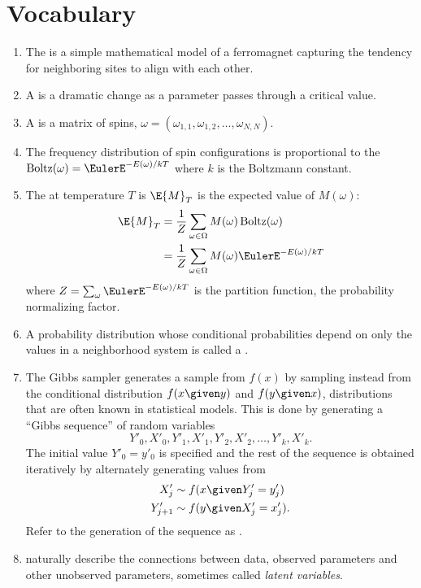 \documentclass[12pt]{article}
\begin{document}
\section*{Vocabulary}
\begin{enumerate}
    \item
        The  is a simple mathematical model of a
        ferromagnet capturing the tendency for neighboring sites to
        align with each other.
    \item
        A  is a dramatic change as a parameter
        passes through a critical value.
    \item
        A  is a matrix of spins, \( \omega = (\omega_
        {1,1}, \omega_{1,2}, \dots, \omega_{N,N}) \).
    \item
        The frequency distribution of spin configurations is
        proportional to the  \(
        \operatorname{Boltz}
        (\omega) = \EulerE^{-E(\omega)/kT} \) where \( k \) is the
        Boltzmann constant.
    \item
        The  at temperature \( T \) is \( \E{M}_T \)
        is the expected value of \( M(\omega) \):
        \begin{align*}
            \E{M}_T &= \frac{1}{Z} \sum\limits_{\omega \in \Omega} M(\omega)
            \operatorname{Boltz}
            (\omega) \\
            &= \frac{1}{Z} \sum\limits_{\omega \in \Omega} M(\omega)
            \EulerE^{-E(\omega)/kT}
        \end{align*}
        where \( Z = \sum_{\omega} \EulerE^{-E(\omega)/kT} \) is the
        partition function, the probability normalizing factor.
    \item
        A probability distribution whose conditional probabilities
        depend on only the values in a neighborhood system is called a
        .
    \item
        The Gibbs sampler generates a sample from \( f(x) \) by sampling
        instead from the conditional distribution \( f(x \given y) \)
        and \( f(y \given x) \), distributions that are often known in
        statistical models.  This is done by generating a ``Gibbs
        sequence'' of random variables
        \[
            Y'_0, X'_0, Y'_1, X'_1, Y'_2, X'_2, \dots, Y'_k, X'_k.
        \] The initial value \( Y'_0 = y'_0 \) is specified and the rest
        of the sequence is obtained iteratively by alternately
        generating values from
        \begin{align*}
            X'_j &\sim f(x \given Y'_j = y'_j) \\
            Y'_{j+1} &\sim f(y \given X'_j = x'_j).  \\
        \end{align*}
        Refer to the generation of the sequence as .
    \item
         naturally describe the
        connections between data, observed parameters and other
        unobserved parameters, sometimes called \emph{latent variables}.
\end{enumerate}
\end{document}

